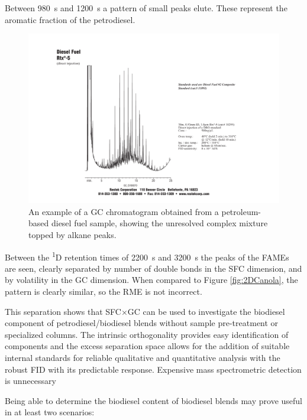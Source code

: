 Between \SI{980}{\second} and \SI{1200}{\second} a pattern of small peaks elute.
These represent the aromatic fraction of the petrodiesel.

\begin{figure}
	\centering
	\includegraphics[width=\textwidth]{Figures/hchump.pdf}
	\decoRule	
	
\caption[An example of a petrochemical fuel chromatogram.]{An example of a GC
chromatogram obtained from a petroleum-based diesel fuel sample, showing the
unresolved complex mixture topped by alkane peaks.}
	
	\label{fig:HCHump} 
\end{figure}

Between the \textsuperscript{1}D retention times of \SI{2200}{\second} and
\SI{3200}{\second} the peaks of the FAMEs are seen, clearly separated by number
of double bonds in the SFC dimension, and by volatility in the GC dimension.
When compared to Figure \ref{fig:2DCanola}, the pattern is clearly similar, so
the RME is not incorrect.

This separation shows that SFC×GC can be used to investigate the biodiesel
component of petrodiesel/biodiesel blends without sample pre-treatment or
specialized columns. The intrinsic orthogonality provides easy identification of
components and the excess separation space allows for the addition of suitable
internal standards for reliable qualitative and quantitative analysis with the
robust FID with its predictable response. Expensive mass spectrometric detection
is unnecessary

Being able to determine the biodiesel content of biodiesel blends may prove
useful in at least two scenarios: 

